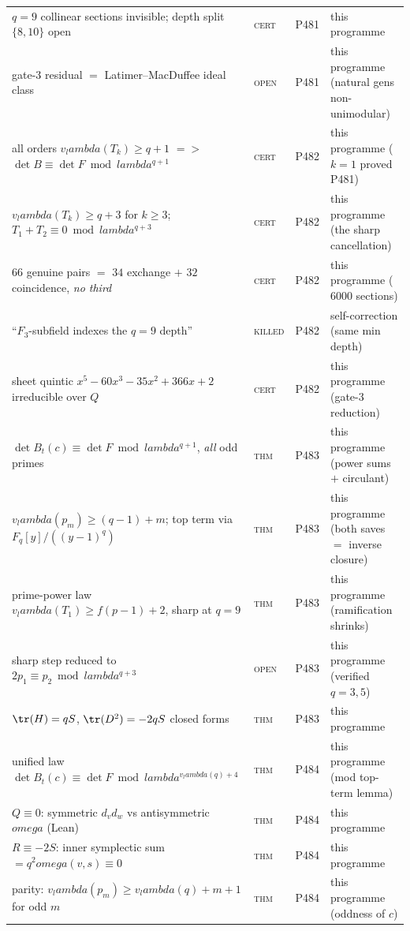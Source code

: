 \documentclass[12pt,a4paper]{article}
\def\mathbb#1{#1}%
\def\textbf#1{#1}%
\def\omega{omega}%
\def\lambda{lambda}%
\def\Rightarrow{ => }%
\theoremstyle{definition}
\newcommand{\FF}{\mathbb{F}}
\newcommand{\QQ}{\mathbb{Q}}
\begin{document}
\begin{center}
\begin{tabular}{@{}p{}llp{}@{}}
$q{=}9$ collinear sections invisible; depth split $\{8,10\}$ open & \textsc{cert} & P481 & this programme \\
gate-3 residual $=$ Latimer--MacDuffee ideal class & \textsc{open} & P481 & this programme (natural gens non-unimodular) \\
all orders $v_\lambda(T_k)\ge q{+}1$ $\Rightarrow$ $\det B\equiv\det F \bmod \lambda^{q+1}$ & \textsc{cert} & P482 & this programme ($k{=}1$ proved P481) \\
$v_\lambda(T_k)\ge q{+}3$ for $k\ge3$; $T_1{+}T_2\equiv0 \bmod \lambda^{q+3}$ & \textsc{cert} & P482 & this programme (the sharp cancellation) \\
$66$ genuine pairs $=$ $34$ exchange $+$ $32$ coincidence, \emph{no third} & \textsc{cert} & P482 & this programme ($6000$ sections) \\
``$\FF_3$-subfield indexes the $q{=}9$ depth'' & \textsc{killed} & P482 & self-correction (same min depth) \\
sheet quintic $x^5{-}60x^3{-}35x^2{+}366x{+}2$ irreducible over $\QQ$ & \textsc{cert} & P482 & this programme (gate-3 reduction) \\
$\det B_t(c)\equiv\det F \bmod \lambda^{q+1}$, \emph{all} odd primes & \textsc{thm} & P483 & this programme (power sums $+$ circulant) \\
$v_\lambda(p_m)\ge(q{-}1){+}m$; top term via $\FF_q[y]/((y{-}1)^q)$ & \textsc{thm} & P483 & this programme (both saves $=$ inverse closure) \\
prime-power law $v_\lambda(T_1)\ge f(p{-}1){+}2$, sharp at $q{=}9$ & \textsc{thm} & P483 & this programme (ramification shrinks) \\
sharp step reduced to $2p_1\equiv p_2 \bmod \lambda^{q+3}$ & \textsc{open} & P483 & this programme (verified $q{=}3,5$) \\
$\tr(H)=qS$, $\tr(D^2)=-2qS$ closed forms & \textsc{thm} & P483 & this programme \\
\textbf{unified law} $\det B_t(c)\equiv\det F \bmod \lambda^{v_\lambda(q)+4}$ & \textsc{thm} & P484 & this programme (mod top-term lemma) \\
$Q\equiv0$: symmetric $d_vd_w$ vs antisymmetric $\omega$ (Lean) & \textsc{thm} & P484 & this programme \\
$R\equiv-2S$: inner symplectic sum $=q^2\omega(v,s)\equiv0$ & \textsc{thm} & P484 & this programme \\
parity: $v_\lambda(p_m)\ge v_\lambda(q){+}m{+}1$ for odd $m$ & \textsc{thm} & P484 & this programme (oddness of $c$) \\

\end{tabular}
\end{center}
\end{document}
